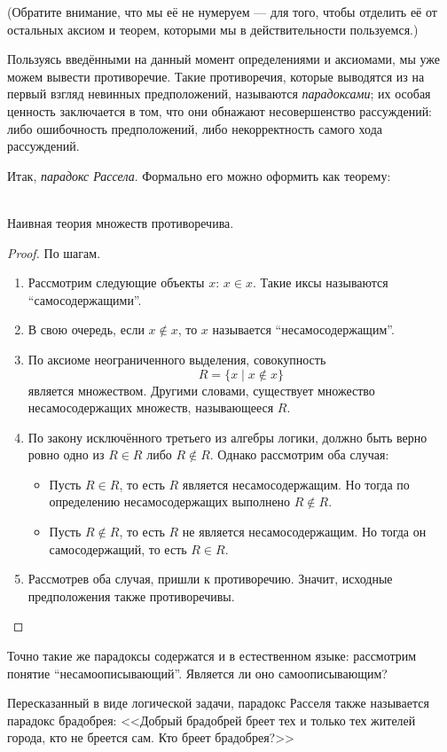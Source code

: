 (Обратите внимание, что мы её не нумеруем --- для того, чтобы отделить её
от остальных аксиом и теорем, которыми мы в действительности пользуемся.)

Пользуясь введёнными на данный момент определениями и аксиомами, мы уже можем
вывести противоречие. Такие противоречия, которые выводятся из на первый взгляд
невинных предположений, называются \textit{парадоксами}; их особая ценность
заключается в том, что они обнажают несовершенство рассуждений: либо ошибочность
предположений, либо некорректность самого хода рассуждений.

Итак, \textit{парадокс Рассела}. Формально его можно оформить как теорему:

\begin{thm}
  \quad\\Наивная теория множеств противоречива.
\end{thm}
\begin{proof}По шагам.
\begin{enumerate}
  \item Рассмотрим следующие объекты $x$: $x\in x$. Такие иксы называются
    ``самосодержащими''.
  \item В свою очередь, если $x\not\in x$, то $x$ называется
    ``несамосодержащим''.
  \item По аксиоме неограниченного выделения, совокупность
    \[R = \{x\;|\;x\not\in x\}\] является множеством. Другими словами,
    существует множество несамосодержащих множеств, называющееся $R$.
  \item По закону исключённого третьего из алгебры логики, должно быть верно
    ровно одно из $R\in R$ либо $R\not\in R$. Однако рассмотрим оба случая:
    \begin{itemize}
      \item Пусть $R\in R$, то есть $R$ является несамосодержащим. Но тогда по
        определению несамосодержащих выполнено $R\not\in R$.
      \item Пусть $R\not\in R$, то есть $R$ не является несамосодержащим. Но
        тогда он самосодержащий, то есть $R\in R$.
    \end{itemize}
  \item Рассмотрев оба случая, пришли к противоречию. Значит, исходные
    предположения также противоречивы.
\end{enumerate}
\end{proof}
\begin{rem*}
  Точно такие же парадоксы содержатся и в естественном языке: рассмотрим понятие
  ``несамоописывающий''. Является ли оно самоописывающим?
\end{rem*}
\begin{rem*}
  Пересказанный в виде логической задачи, парадокс Расселя также называется
  парадокс брадобрея: <<Добрый брадобрей бреет тех и только тех жителей города,
  кто не бреется сам. Кто бреет брадобрея?>>
\end{rem*}

